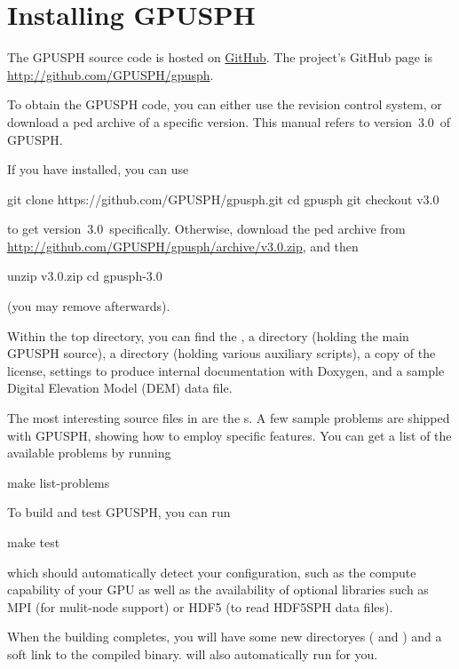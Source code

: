 \documentclass[12pt]{memoir}
\newcommand{\version}{3.0}
\newcommand{\currentver}{version~\version}
\begin{document}
\section{Installing GPUSPH}

The GPUSPH source code is hosted on \href{http://github.com}{GitHub}.
The project's GitHub page is \url{http://github.com/GPUSPH/gpusph}.

To obtain the GPUSPH code, you can either use the  revision
control system, or download a ped archive of a specific
version. This manual refers to \currentver\ of GPUSPH.

If you have  installed, you can use
\begin{shellcode}[escapeinside=\{\}]
git clone https://github.com/GPUSPH/gpusph.git
cd gpusph
git checkout v{\version}
\end{shellcode}
to get \currentver\ specifically. Otherwise, download the ped
archive from \url{http://github.com/GPUSPH/gpusph/archive/v\version.zip},
and then
\begin{shellcode}[escapeinside=\{\}]
unzip v{\version}.zip
cd gpusph-{\version}
\end{shellcode}
(you may remove \cmd{v\version.zip} afterwards).

Within the top directory, you can find the , a 
directory (holding the main GPUSPH source), a  directory
(holding various auxiliary scripts), a copy of the license, settings to
produce internal documentation with Doxygen, and a sample Digital
Elevation Model (DEM) data file.

The most interesting source files in  are the s.
A few sample problems are shipped with GPUSPH, showing how to employ
specific features. You can get a list of the available problems by
running
\begin{shellcode}
make list-problems
\end{shellcode}

To build and test GPUSPH, you can run
\begin{shellcode}
make test
\end{shellcode}
which should automatically detect your configuration, such as the
compute capability of your GPU as well as the availability of optional
libraries such as MPI (for mulit-node support) or HDF5 (to read HDF5SPH
data files).

When the building completes, you will have some new directoryes
( and ) and a  soft link to the
compiled binary.  will also automatically run
 for you.
\end{document}
